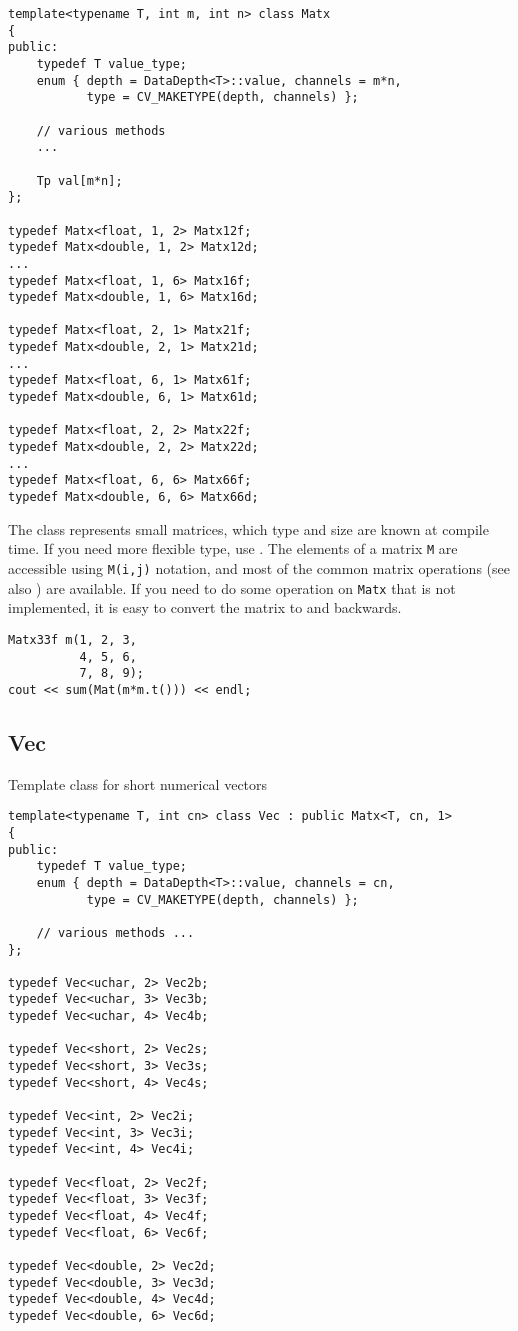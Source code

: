 \begin{lstlisting}
template<typename T, int m, int n> class Matx
{
public:
    typedef T value_type;
    enum { depth = DataDepth<T>::value, channels = m*n,
           type = CV_MAKETYPE(depth, channels) };
    
    // various methods
    ...

    Tp val[m*n];
};

typedef Matx<float, 1, 2> Matx12f;
typedef Matx<double, 1, 2> Matx12d;
...
typedef Matx<float, 1, 6> Matx16f;
typedef Matx<double, 1, 6> Matx16d;
    
typedef Matx<float, 2, 1> Matx21f;
typedef Matx<double, 2, 1> Matx21d;
...
typedef Matx<float, 6, 1> Matx61f;
typedef Matx<double, 6, 1> Matx61d;

typedef Matx<float, 2, 2> Matx22f;
typedef Matx<double, 2, 2> Matx22d;
...
typedef Matx<float, 6, 6> Matx66f;
typedef Matx<double, 6, 6> Matx66d;
\end{lstlisting}

The class represents small matrices, which type and size are known at compile time. If you need more flexible type, use . The elements of a matrix \texttt{M} are accessible using \texttt{M(i,j)} notation, and most of the common matrix operations (see also ) are available. If you need to do some operation on \texttt{Matx} that is not implemented, it is easy to convert the matrix to  and backwards.

\begin{lstlisting}
Matx33f m(1, 2, 3,
          4, 5, 6,
          7, 8, 9);
cout << sum(Mat(m*m.t())) << endl;
\end{lstlisting}

\subsection{Vec}\label{Vec}
Template class for short numerical vectors

\begin{lstlisting}
template<typename T, int cn> class Vec : public Matx<T, cn, 1>
{
public:
    typedef T value_type;
    enum { depth = DataDepth<T>::value, channels = cn,
           type = CV_MAKETYPE(depth, channels) };

    // various methods ...
};

typedef Vec<uchar, 2> Vec2b;
typedef Vec<uchar, 3> Vec3b;
typedef Vec<uchar, 4> Vec4b;

typedef Vec<short, 2> Vec2s;
typedef Vec<short, 3> Vec3s;
typedef Vec<short, 4> Vec4s;

typedef Vec<int, 2> Vec2i;
typedef Vec<int, 3> Vec3i;
typedef Vec<int, 4> Vec4i;

typedef Vec<float, 2> Vec2f;
typedef Vec<float, 3> Vec3f;
typedef Vec<float, 4> Vec4f;
typedef Vec<float, 6> Vec6f;

typedef Vec<double, 2> Vec2d;
typedef Vec<double, 3> Vec3d;
typedef Vec<double, 4> Vec4d;
typedef Vec<double, 6> Vec6d;
\end{lstlisting}

